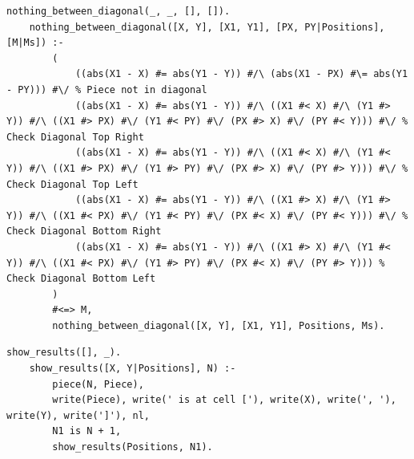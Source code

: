 \documentclass[runningheads]{llncs}
\begin{document}
\begin{lstlisting}[caption={Nothing Between horizontal and vertical}]
    nothing_between_diagonal(_, _, [], []).
    nothing_between_diagonal([X, Y], [X1, Y1], [PX, PY|Positions], [M|Ms]) :-
        (
            ((abs(X1 - X) #= abs(Y1 - Y)) #/\ (abs(X1 - PX) #\= abs(Y1 - PY))) #\/ % Piece not in diagonal
            ((abs(X1 - X) #= abs(Y1 - Y)) #/\ ((X1 #< X) #/\ (Y1 #> Y)) #/\ ((X1 #> PX) #\/ (Y1 #< PY) #\/ (PX #> X) #\/ (PY #< Y))) #\/ % Check Diagonal Top Right
            ((abs(X1 - X) #= abs(Y1 - Y)) #/\ ((X1 #< X) #/\ (Y1 #< Y)) #/\ ((X1 #> PX) #\/ (Y1 #> PY) #\/ (PX #> X) #\/ (PY #> Y))) #\/ % Check Diagonal Top Left
            ((abs(X1 - X) #= abs(Y1 - Y)) #/\ ((X1 #> X) #/\ (Y1 #> Y)) #/\ ((X1 #< PX) #\/ (Y1 #< PY) #\/ (PX #< X) #\/ (PY #< Y))) #\/ % Check Diagonal Bottom Right
            ((abs(X1 - X) #= abs(Y1 - Y)) #/\ ((X1 #> X) #/\ (Y1 #< Y)) #/\ ((X1 #< PX) #\/ (Y1 #> PY) #\/ (PX #< X) #\/ (PY #> Y))) % Check Diagonal Bottom Left
        )
        #<=> M,
        nothing_between_diagonal([X, Y], [X1, Y1], Positions, Ms).
\end{lstlisting}

\newpage
\begin{lstlisting}[caption={Nothing Between horizontal and vertical}]
    show_results([], _).
    show_results([X, Y|Positions], N) :-
        piece(N, Piece),
        write(Piece), write(' is at cell ['), write(X), write(', '), write(Y), write(']'), nl,
        N1 is N + 1,
        show_results(Positions, N1).
\end{lstlisting}
\end{document}
